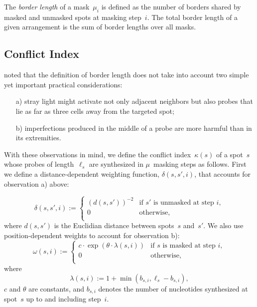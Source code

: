\documentclass{bioinfo}
\begin{document}
The \emph{border length} of a mask~$\mu_{i}$ is defined as the number of borders shared by masked and unmasked spots at masking step~$i$. The total border length of a given arrangement is the sum of border lengths over all masks.

\subsection{Conflict Index}

\citealp{KAHNG03_1} noted that the definition of border length does not take into account two simple yet important practical considerations:
\begin{itemize}
\item[a)] stray light might activate not only adjacent neighbors but also probes that lie as far as three cells away from the targeted spot;
\item[b)] imperfections produced in the middle of a probe are more harmful than in its extremities.
\end{itemize}

With these observations in mind, we define the conflict index~$\kappa(s)$ of a spot~$s$ whose probes of length~$\ell_{s}$ are synthesized in $\mu$~masking steps as follows. First we define a distance-dependent weighting function, $\delta(s,s',i)$, that accounts for observation a) above:

\begin{equation}
\label{eq:dist_weight} \delta(s,s',i) :=
        \left\{
                \begin{array}{ll}
                        (d(s,s'))^{-2} & \mbox{if $s'$ is unmasked at step $i$}, \\
                        0 & \mbox{otherwise}, \\
                \end{array}
        \right.
\end{equation}
where $d(s,s')$ is the Euclidian distance between spots~$s$ and~$s'$. We also use position-dependent weights to account for observation b):
\begin{equation}
\label{eq:pos_mult} \omega(s,i) :=
        \left\{
                \begin{array}{ll}
                        c \cdot \exp{\left(\theta \cdot \lambda(s,i)\right)} & \mbox{if $s$ is masked at step $i$}, \\
                        0 & \mbox{otherwise}, \\
                \end{array}
        \right.
\end{equation}
where
\begin{equation}
\label{eq:base_pos} \lambda(s,i) := 1 + \min(b_{s,i},\ell_{s} - b_{s,i}),
\end{equation}
$c$ and $\theta$ are constants, and $b_{s,i}$ denotes the number of nucleotides synthesized at spot~$s$ up to and including step~$i$.
\end{document}
